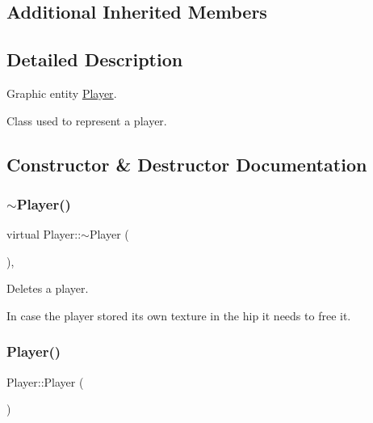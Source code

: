 \subsection*{Additional Inherited Members}


\subsection{Detailed Description}
Graphic entity \hyperlink{class_player}{Player}. 

Class used to represent a player. 

\subsection{Constructor \& Destructor Documentation}
\mbox{\label{class_player_a8981c201ffb2270c0b6dbd467b627376}} 
\subsubsection{\texorpdfstring{$\sim$\+Player()}{~Player()}}
{\footnotesize\ttfamily virtual Player\+::$\sim$\+Player (\begin{DoxyParamCaption}{ }\end{DoxyParamCaption})\hspace{0.3cm}{\ttfamily [inline]}, {\ttfamily [virtual]}}



Deletes a player. 

In case the player stored it\textquotesingle{}s own texture in the hip it needs to free it. \mbox{\label{class_player_affe0cc3cb714f6deb4e62f0c0d3f1fd8}} 
\subsubsection{\texorpdfstring{Player()}{Player()}\hspace{0.1cm}{\footnotesize\ttfamily [1/2]}}
{\footnotesize\ttfamily Player\+::\+Player (\begin{DoxyParamCaption}{ }\end{DoxyParamCaption})\hspace{0.3cm}{\ttfamily [protected]}}



